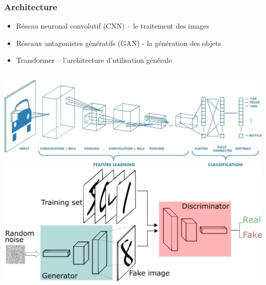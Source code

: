 \documentclass{beamer}
\begin{document}
	\begin{frame}
		\frametitle{Architecture}
		\begin{itemize}
			\item Réseau neuronal convolutif (CNN) – le traitement des images
			\item Réseaux antagonistes génératifs (GAN) - la génération des objets
			\item Transformer – l'architecture d'utilisation générale
		\end{itemize}
		
		\begin{columns}[c]
			\centering
			\includegraphics[width=\textwidth]{3}
			\centering
			\includegraphics[width=\textwidth]{2}
			\centering

\end{columns}
\end{frame}
\end{document}
